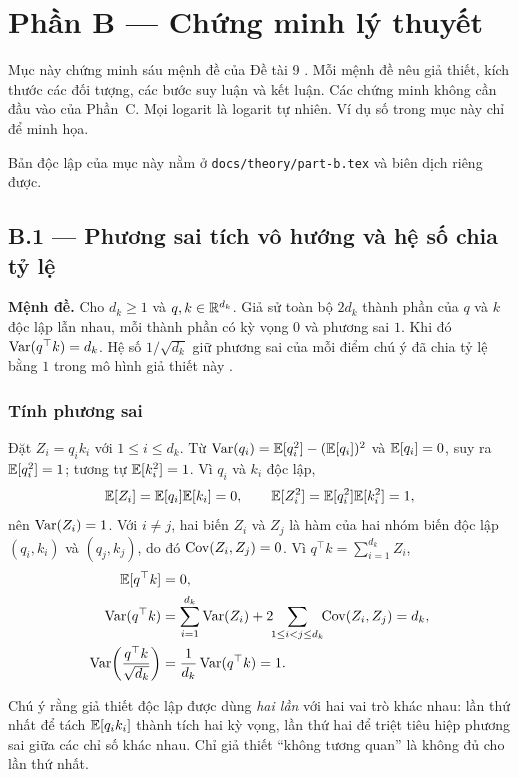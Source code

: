 \section{Phần B --- Chứng minh lý thuyết}
\label{sec:phan-b}

Mục này chứng minh sáu mệnh đề của Đề tài 9 \cite[tr.~18]{de}. Mỗi mệnh đề nêu
giả thiết, kích thước các đối tượng, các bước suy luận và kết luận. Các chứng minh
không cần đầu vào của Phần~C. Mọi logarit là logarit tự nhiên. Ví dụ số trong mục
này chỉ để minh họa.

Bản độc lập của mục này nằm ở \texttt{docs/theory/part-b.tex} và biên dịch riêng
được.

\subsection{B.1 --- Phương sai tích vô hướng và hệ số chia tỷ lệ}
\label{sec:b1}

\textbf{Mệnh đề.} Cho $d_k\ge 1$ và $q,k\in\mathbb{R}^{d_k}$. Giả sử toàn bộ $2d_k$ thành
phần của $q$ và $k$ độc lập lẫn nhau, mỗi thành phần có kỳ vọng $0$ và phương sai
$1$. Khi đó $\operatorname{Var}(q^\top k)=d_k$. Hệ số $1/\sqrt{d_k}$ giữ phương sai của mỗi điểm
chú ý đã chia tỷ lệ bằng $1$ trong mô hình giả thiết này
\cite[§3.2.1, chú thích 4]{attention}.

\subsubsection{Tính phương sai}

Đặt $Z_i=q_i k_i$ với $1\le i\le d_k$. Từ $\operatorname{Var}(q_i)=\mathbb{E}[q_i^2]-(\mathbb{E}[q_i])^2$ và
$\mathbb{E}[q_i]=0$, suy ra $\mathbb{E}[q_i^2]=1$; tương tự $\mathbb{E}[k_i^2]=1$. Vì $q_i$ và $k_i$ độc
lập,
\[
  \mathbb{E}[Z_i]=\mathbb{E}[q_i]\mathbb{E}[k_i]=0,\qquad
  \mathbb{E}[Z_i^2]=\mathbb{E}[q_i^2]\mathbb{E}[k_i^2]=1,
\]
nên $\operatorname{Var}(Z_i)=1$. Với $i\ne j$, hai biến $Z_i$ và $Z_j$ là hàm của hai nhóm biến
độc lập $(q_i,k_i)$ và $(q_j,k_j)$, do đó $\operatorname{Cov}(Z_i,Z_j)=0$. Vì
$q^\top k=\sum_{i=1}^{d_k} Z_i$,
\begin{align}
  \mathbb{E}[q^\top k]&=0,\notag\\
  \operatorname{Var}(q^\top k)
    &=\sum_{i=1}^{d_k}\operatorname{Var}(Z_i)+2\!\!\sum_{1\le i<j\le d_k}\!\!\operatorname{Cov}(Z_i,Z_j)=d_k,
    \label{eq:b1-var}\\
  \operatorname{Var}\!\left(\frac{q^\top k}{\sqrt{d_k}}\right)
    &=\frac{1}{d_k}\operatorname{Var}(q^\top k)=1.\notag
\end{align}

Chú ý rằng giả thiết độc lập được dùng \emph{hai lần} với hai vai trò khác nhau:
lần thứ nhất để tách $\mathbb{E}[q_ik_i]$ thành tích hai kỳ vọng, lần thứ hai để triệt tiêu
hiệp phương sai giữa các chỉ số khác nhau. Chỉ giả thiết ``không tương quan'' là
không đủ cho lần thứ nhất.

